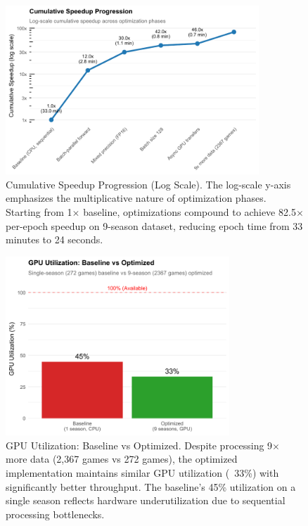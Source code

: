 \begin{figure}[htbp]
\centering
\includegraphics[width=0.85\textwidth]{../figures/out/gnn_cumulative_speedup.pdf}
\caption{Cumulative Speedup Progression (Log Scale). The log-scale y-axis emphasizes the multiplicative nature of optimization phases. Starting from 1$\times$ baseline, optimizations compound to achieve 82.5$\times$ per-epoch speedup on 9-season dataset, reducing epoch time from 33 minutes to 24 seconds.}
\label{fig:gnn_cumulative_speedup}
\end{figure}

\begin{figure}[htbp]
\centering
\includegraphics[width=0.75\textwidth]{../figures/out/gnn_gpu_utilization_comparison.pdf}
\caption{GPU Utilization: Baseline vs Optimized. Despite processing 9$\times$ more data (2,367 games vs 272 games), the optimized implementation maintains similar GPU utilization (~33\%) with significantly better throughput. The baseline's 45\% utilization on a single season reflects hardware underutilization due to sequential processing bottlenecks.}
\label{fig:gnn_gpu_utilization}
\end{figure}

